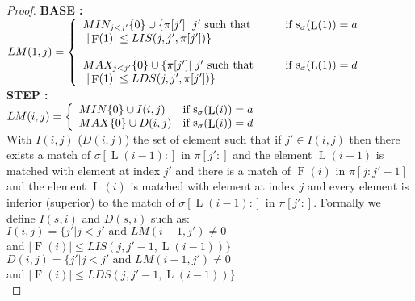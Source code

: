 \documentclass[a4paper]{llncs}
\newcommand{\ptext}{\pi}
\newcommand{\pmotif}{\sigma}
\DeclareMathOperator{\stripea}{s}
\newcommand{\stripe}[2]{\stripea_{{#1}}({#2})}
\newcommand{\dstep}{d}
\newcommand{\ustep}{a}
\DeclareMathOperator{\firsta}{L}
\newcommand{\first}[1]{\firsta({#1})}
\DeclareMathOperator{\factora}{F}
\newcommand{\factor}[1]{\factora({#1})}
\begin{document}
\begin{proof}
\textbf{BASE :} \\
$LM(1,j)= \left\{ 
	\begin{array}{l l}
	
		MIN_{j<j'}\{0\} \cup \{\ptext[j'] |\text{ $j'$ such that \indent } & 
		\text{if $\stripe{\pmotif}{\first{1}}=\ustep$}\\
		\text{ $|\factor{1}| \leq LIS(j,j',\ptext[j'])  $}\}&\\			
	
	
		&\\
		
		MAX_{j<j'}\{0\} \cup \{\ptext[j'] |\text{ $j'$ such that \indent } &
		\text{if $\stripe{\pmotif}{\first{1}}=\dstep$} \\
		\text{ $|\factor{1}| \leq LDS(j,j',\ptext[j']) $}\}&\\			
	
	\end{array} \right. $\\	

\textbf{STEP :} \\
$LM(i,j)= \left\{ 
	\begin{array}{l l}
	
		MIN \{0\} \cup  I(i,j) & 
		\text{if $\stripe{\pmotif}{\first{i}}=\ustep$}\\

		
		MAX \{0\} \cup  D(i,j) & 
		\text{if $\stripe{\pmotif}{\first{i}}=\dstep$}\\

		
							
	\end{array} \right. $\\
					
With $I(i,j)$ ($D(i,j)$) the set of element such that
if  $j' \in I(i,j)$ then there exists 
a match of $\pmotif[\first{i-1}:]$ in $\ptext[j':]$ and
the element $\first{i-1}$ is matched with element at index $j'$ and
there is a match of $\factor{i}$ in $\ptext[j:j'-1]$ and
the element $\first{i}$ is matched with element at index $j$ and every element is inferior (superior) to the match of  
$\pmotif[\first{i-1}:]$ in $\ptext[j':]$.
Formally we define $I(s,i)$ and $D(s,i)$ such as:\\
			
$I(i,j)=\{j'|\text{$j<j'$ and $LM(i-1,j')\neq 0$}$ \\
\indent \indent \indent and  $|\factor{i}| \leq LIS(j,j'-1,\first{i-1})\}$ \\

$D(i,j)=\{j'|\text{$j<j'$ and $LM(i-1,j')\neq 0$}$ \\
\indent \indent \indent and  $|\factor{i}| \leq LDS(j,j'-1,\first{i-1}) \}$ \\
					                       

\end{proof}
\end{document}
